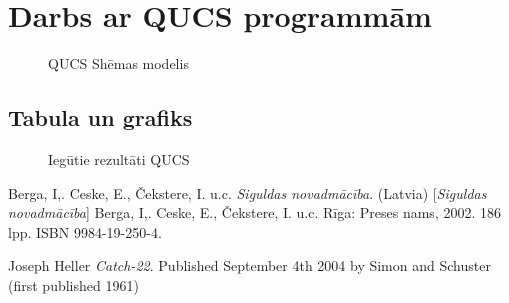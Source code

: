 \documentclass{report}
\begin{document}
\section{Darbs ar QUCS programmām}
\begin{figure}[h]
        \centering
        \caption{QUCS Shēmas modelis}
        \label{fig:my_label4}
    \end{figure}
    
    
    
    
    
    
    
    \subsection{Tabula un grafiks}
    \begin{figure}[h]
        \centering
        \caption{Iegūtie rezultāti QUCS}
        \label{fig:my_label5}
\end{figure}
\begin{thebibliography}{9}
Berga, I,. Ceske, E., Čekstere, I. u.c. 
\textit{Siguldas novadmācība}. (Latvia) 
[\textit{Siguldas novadmācība}]
Berga, I,. Ceske, E., Čekstere, I. u.c. Rīga: Preses nams, 2002. 186 lpp. ISBN 9984-19-250-4.

Joseph Heller
\textit{Catch-22}. 
Published September 4th 2004 by Simon and Schuster (first published 1961)
\end{thebibliography}
\end{document}
